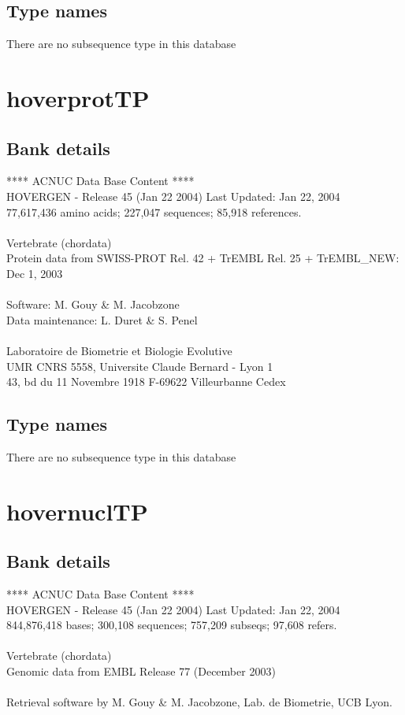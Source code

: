 \documentclass{article}
\begin{document}
\begin{Schunk}
\subsection{Type names}
There are no subsequence type in this database
\section{ hoverprotTP }
\subsection{Bank details}
               ****     ACNUC Data Base Content      ****                       \\
         HOVERGEN - Release 45 (Jan 22 2004) Last Updated: Jan 22, 2004\\
          77,617,436 amino acids; 227,047 sequences; 85,918 references.\\
\\
                       Vertebrate (chordata)	  \\
Protein data from SWISS-PROT Rel. 42  + TrEMBL Rel. 25 + TrEMBL\_NEW: Dec 1, 2003\\
\\
Software: M. Gouy \& M. Jacobzone\\
Data maintenance: L. Duret \& S. Penel\\
\\
Laboratoire de Biometrie et Biologie Evolutive\\
UMR CNRS 5558, Universite Claude Bernard - Lyon 1 \\
43, bd du 11 Novembre 1918 F-69622 Villeurbanne Cedex\\


\subsection{Type names}
There are no subsequence type in this database
\section{ hovernuclTP }
\subsection{Bank details}
               ****     ACNUC Data Base Content      ****                      \\
         HOVERGEN - Release 45 (Jan 22 2004) Last Updated: Jan 22, 2004\\
844,876,418 bases; 300,108 sequences; 757,209 subseqs; 97,608 refers.\\
                                                                               \\
                       Vertebrate (chordata)\\
             Genomic data from EMBL Release 77  (December 2003)\\
\\
Retrieval software by M. Gouy \& M. Jacobzone, Lab. de Biometrie, UCB Lyon.


\end{Schunk}
\end{document}
